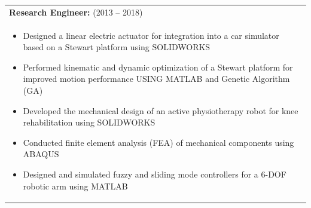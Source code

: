 \documentclass[lighthipster]{simplehipstercv}
\begin{document}
\begin{table}[h]
\begin{tabularx}{\linewidth}{X}
			\vspace{0.01cm}
			\textbf{Research Engineer:} (2013 -- 2018) \\
			\vspace{-0.3cm}
			\begin{itemize}[leftmargin=1em, itemsep=0pt, topsep=0pt]
				\item Designed a linear electric actuator for integration into a car simulator based on a Stewart platform using SOLIDWORKS
				\item Performed kinematic and dynamic optimization of a Stewart platform for improved motion performance USING MATLAB and Genetic Algorithm (GA)
				\item Developed the mechanical design of an active physiotherapy robot for knee rehabilitation using SOLIDWORKS
				\item Conducted finite element analysis (FEA) of mechanical components using ABAQUS
				\item Designed and simulated fuzzy and sliding mode controllers for a 6-DOF robotic arm using MATLAB
			\end{itemize} \\
		\end{tabularx}
	\end{table}


\end{document}
